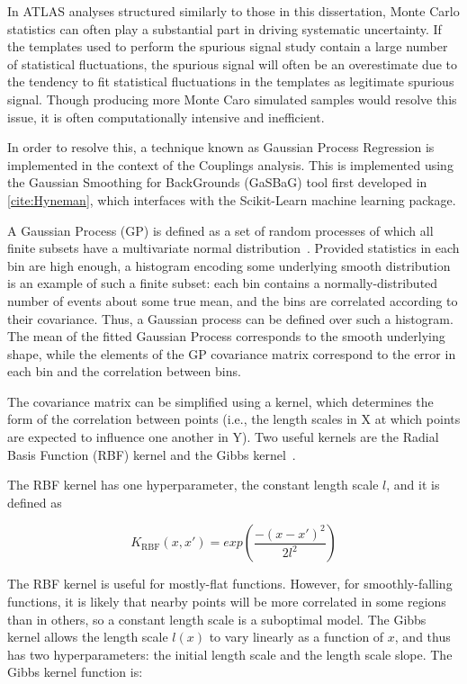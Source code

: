 In ATLAS analyses structured similarly to those in this dissertation, Monte Carlo statistics can often play a substantial part in driving systematic uncertainty. If the templates used to perform the spurious signal study contain a large number of statistical fluctuations, the spurious signal will often be an overestimate due to the tendency to fit statistical fluctuations in the templates as legitimate spurious signal. Though producing more Monte Caro simulated samples would resolve this issue, it is often computationally intensive and inefficient.

In order to resolve this, a technique known as Gaussian Process Regression is implemented in the context of the Couplings analysis. This is implemented using the Gaussian Smoothing for BackGrounds (GaSBaG) tool first developed in \ref{cite:Hyneman}, which interfaces with the Scikit-Learn \cite{scikit-learn} machine learning package.

A Gaussian Process (GP) is defined as a set of random processes of which all finite subsets have a multivariate normal distribution~\cite{ebden2015gaussian}. Provided statistics in each bin are high enough, a histogram encoding some underlying smooth distribution is an example of such a finite subset: each bin contains a normally-distributed number of events about some true mean, and the bins are correlated according to their covariance. Thus, a Gaussian process can be defined over such a histogram. The mean of the fitted Gaussian Process corresponds to the smooth underlying shape, while the elements of the GP covariance matrix correspond to the error in each bin and the correlation between bins.

The covariance matrix can be simplified using a kernel, which determines the form of the correlation between points (i.e., the length scales in X at which points are expected to influence one another in Y). Two useful kernels are the Radial Basis Function (RBF) kernel and the Gibbs kernel~\cite{3569,Gibbs}. 

The RBF kernel has one hyperparameter, the constant length scale $l$, and it is defined as

\begin{equation}
K_\text{RBF}(x,x') = exp\left(\frac{-(x-x')^2}{2l^2}\right)
\end{equation}

The RBF kernel is useful for mostly-flat functions. However, for smoothly-falling functions, it is likely that nearby points will be more correlated in some regions than in others, so a constant length scale is a suboptimal model. The Gibbs kernel allows the length scale $l(x)$ to vary linearly as a function of $x$, and thus has two hyperparameters: the initial length scale and the length scale slope. The Gibbs kernel function is: 

